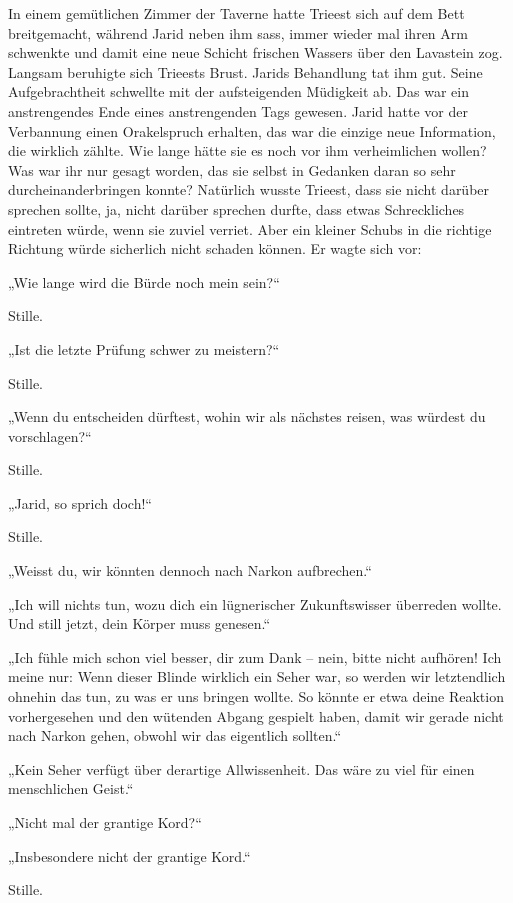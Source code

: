 In einem gemütlichen Zimmer der Taverne hatte Trieest sich auf dem Bett breitgemacht, während Jarid neben ihm sass, immer wieder mal ihren Arm schwenkte und damit eine neue Schicht frischen Wassers über den Lavastein zog. Langsam beruhigte sich Trieests Brust. Jarids Behandlung tat ihm gut. Seine Aufgebrachtheit schwellte mit der aufsteigenden Müdigkeit ab. Das war ein anstrengendes Ende eines anstrengenden Tags gewesen. Jarid hatte vor der Verbannung einen Orakelspruch erhalten, das war die einzige neue Information, die wirklich zählte. Wie lange hätte sie es noch vor ihm verheimlichen wollen? Was war ihr nur gesagt worden, das sie selbst in Gedanken daran so sehr durcheinanderbringen konnte? Natürlich wusste Trieest, dass sie nicht darüber sprechen sollte, ja, nicht darüber sprechen durfte, dass etwas Schreckliches eintreten würde, wenn sie zuviel verriet. Aber ein kleiner Schubs in die richtige Richtung würde sicherlich nicht schaden können. Er wagte sich vor:

„Wie lange wird die Bürde noch mein sein?“

Stille.

„Ist die letzte Prüfung schwer zu meistern?“

Stille.

„Wenn du entscheiden dürftest, wohin wir als nächstes reisen, was würdest du vorschlagen?“

Stille.

„Jarid, so sprich doch!“

Stille.

„Weisst du, wir könnten dennoch nach Narkon aufbrechen.“

„Ich will nichts tun, wozu dich ein lügnerischer Zukunftswisser überreden wollte. Und still jetzt, dein Körper muss genesen.“

„Ich fühle mich schon viel besser, dir zum Dank – nein, bitte nicht aufhören! Ich meine nur: Wenn dieser Blinde wirklich ein Seher war, so werden wir letztendlich ohnehin das tun, zu was er uns bringen wollte. So könnte er etwa deine Reaktion vorhergesehen und den wütenden Abgang gespielt haben, damit wir gerade nicht nach Narkon gehen, obwohl wir das eigentlich sollten.“

„Kein Seher verfügt über derartige Allwissenheit. Das wäre zu viel für einen menschlichen Geist.“

„Nicht mal der grantige Kord?“

„Insbesondere nicht der grantige Kord.“

Stille.

